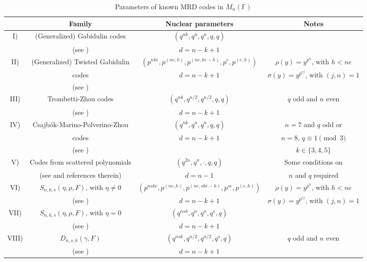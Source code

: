 \documentclass[a4paper, 11pt]{article}
\newcommand{\F}{{\mathbb F}}
\begin{document}
\begin{table}[ht]
\begin{footnotesize}
\begin{center}
    \begin{tabular}{|c|c|c|c|} 
        \hline
        & \textbf{Family} & \textbf{Nuclear parameters} & \textbf{Notes} \\ \hline
        I) & (Generalized) Gabidulin codes  & $(q^{nk},q^n,q^n,q,q)$ &  \\
        & (see \cite{delsarte1978bilinear,gabidulin1985theory,Gabidulins}) & $d=n-k+1$ & \\
        \hline
        II) & (Generalized)
Twisted Gabidulin & $\left(p^{nke},p^{(ne,h)},p^{(ne,ke-h)},p^{e},p^{(e,h)}\right)$ & $\rho(y)=y^{p^h}$, with $h < ne$ \\
 & codes  
  & $d=n-k+1$ & $\sigma(y)=y^{p^{ej}}$, with $(j,n)=1$  \\
        & (see \cite{sheekey2016new,otal2016additive,lunardon2018generalized}) &  & \\ \hline
        III) & Trombetti-Zhou codes  & $(q^{nk},q^{n/2},q^{n/2},q,q)$ & $q$ odd and $n$ even \\
        & (see \cite{trombetti2018new}) & $d=n-k+1$ & \\  \hline
        IV) & Csajb\'ok-Marino-Polverino-Zhou  & $(q^{nk},q^n,q^n,q,q)$ & $n = 7$ and $q$ odd or  \\ 
        & codes  & $d=n-k+1$ & $n = 8$, $q \equiv 1 \pmod{3}$ \\ 
        & (see \cite{csajbok2020mrd}) &  & $k \in \{3,4,5\}$ \\ \hline
        V) & Codes from scattered polynomials & $(q^{2n},q^n,\cdot,q,q)$ 
        & Some conditions on \\
         & (see \cite{longobardi2024scattered} and references therein)
         & 
         $d=n-1$ &  $n$ and $q$ required \\ \hline
        VI) & $S_{n,k,s}(\eta,\rho,F)$, with $\eta \neq 0$ 
         & $\left(p^{nske},p^{(ne,h)},p^{(ne,ske-h)},p^{se},p^{(e,h)}\right)$ & $\rho(y)=y^{p^h}$, with $h < ne$ \\ 
        & (see \cite{sheekey2020new}) & $d=n-k+1$ &  $\sigma(y)=y^{p^{ej}}$, with $(j,n)=1$ \\ \hline 
 VII) & $S_{n,k,s}(\eta,\rho,F)$, with $\eta = 0$ 
         & $\left(q^{nsk}, q^n,q^n,q^s,q\right)$ & \\ 
        & (see \cite{sheekey2020new}) & $d=n-k+1$ & \\ \hline
        VIII) & $D_{n,s,k}(\gamma,F)$ & $(q^{nsk},q^{n/2},q^{n/2},q^s,q)$ & $q$ odd and $n$ even \\ 
        & (see \cite{lobillo2025quotients}) & $d=n-k+1$& \\ \hline
    \end{tabular} 
\end{center}
\caption{Parameters of known MRD codes in $M_n(\F)$}
    \label{tab:parameters}
    \end{footnotesize}
\end{table}
\end{document}
